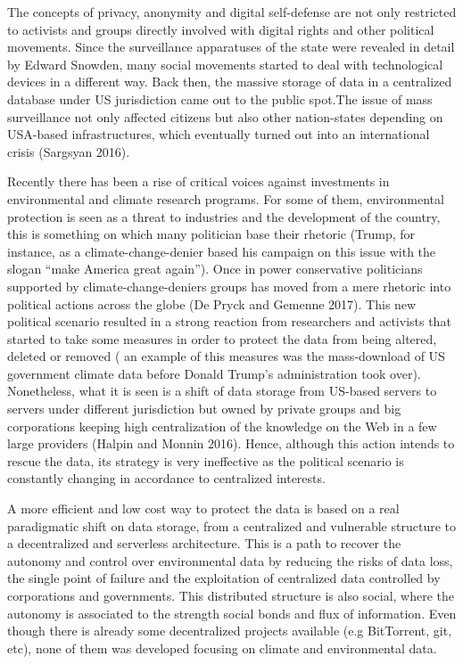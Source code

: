 \documentclass[conference,final,]{IEEEtran}
\begin{document}
The concepts of privacy, anonymity and digital self-defense are not only
restricted to activists and groups directly involved with digital rights
and other political movements. Since the surveillance apparatuses of the
state were revealed in detail by Edward Snowden, many social movements
started to deal with technological devices in a different way. Back
then, the massive storage of data in a centralized database under US
jurisdiction came out to the public spot.The issue of mass surveillance
not only affected citizens but also other nation-states depending on
USA-based infrastructures, which eventually turned out into an
international crisis (Sargsyan 2016).

Recently there has been a rise of critical voices against investments in
environmental and climate research programs. For some of them,
environmental protection is seen as a threat to industries and the
development of the country, this is something on which many politician
base their rhetoric (Trump, for instance, as a climate-change-denier
based his campaign on this issue with the slogan ``make America great
again''). Once in power conservative politicians supported by
climate-change-deniers groups has moved from a mere rhetoric into
political actions across the globe (De Pryck and Gemenne 2017). This new
political scenario resulted in a strong reaction from researchers and
activists that started to take some measures in order to protect the
data from being altered, deleted or removed ( an example of this
measures was the mass-download of US government climate data before
Donald Trump's administration took over). Nonetheless, what it is seen
is a shift of data storage from US-based servers to servers under
different jurisdiction but owned by private groups and big corporations
keeping high centralization of the knowledge on the Web in a few large
providers (Halpin and Monnin 2016). Hence, although this action intends
to rescue the data, its strategy is very ineffective as the political
scenario is constantly changing in accordance to centralized interests.

A more efficient and low cost way to protect the data is based on a real
paradigmatic shift on data storage, from a centralized and vulnerable
structure to a decentralized and serverless architecture. This is a path
to recover the autonomy and control over environmental data by reducing
the risks of data loss, the single point of failure and the exploitation
of centralized data controlled by corporations and governments. This
distributed structure is also social, where the autonomy is associated
to the strength social bonds and flux of information. Even though there
is already some decentralized projects available (e.g BitTorrent, git,
etc), none of them was developed focusing on climate and environmental
data.
\end{document}
